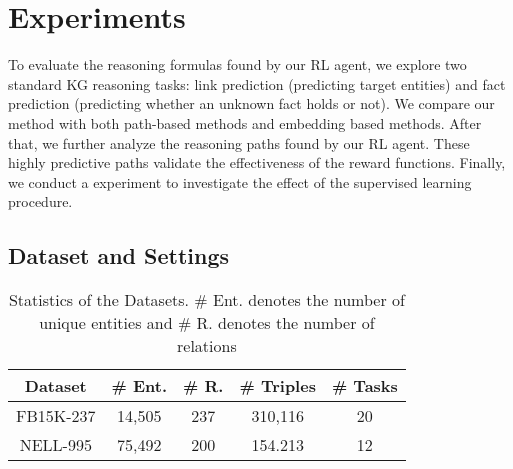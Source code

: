 \documentclass[11pt,letterpaper]{article}
\begin{document}
\section{Experiments}
\label{sec:exp}
To evaluate the reasoning formulas found by our RL agent, we explore two standard KG reasoning tasks:  link prediction (predicting target entities) and fact prediction (predicting whether an unknown fact holds or not). We compare our method with both path-based methods and embedding based methods. After that, we further analyze the reasoning paths found by our RL agent. These highly predictive paths validate the effectiveness of the reward functions. Finally, we conduct a experiment to investigate the effect of the supervised learning procedure.
\subsection{Dataset and Settings}
\begin{table}[h!]
\small
\centering
 \begin{tabular}{||c c c c c||} 
 \hline
 Dataset & \# Ent. & \# R. & \# Triples & \# Tasks\\ 
 \hline\hline
FB15K-237 & 14,505 & 237 & 310,116 & 20 \\ 
 NELL-995 & 75,492 & 200 & 154.213 & 12\\
 \hline
 \end{tabular}
 \caption{Statistics of the Datasets. \# Ent. denotes the number of unique entities and \# R. denotes the number of relations}
 \label{stats}
\end{table}
\end{document}

